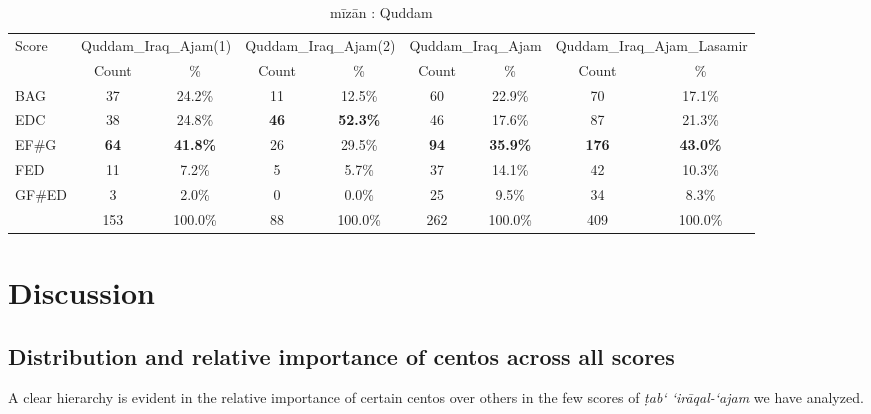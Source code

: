 \documentclass{article}
\begin{document}
\begin{table}[htbp]
    \caption{mīzān : Quddam}
    \begin{adjustbox}{width=0.5\textwidth}
    \small %
    \begin{tabular}{@{}lcccccccc@{}} %
        \toprule
        \multirow{2}{*}{Score} & \multicolumn{2}{c}{Quddam\_Iraq\_Ajam(1)} & \multicolumn{2}{c}{Quddam\_Iraq\_Ajam(2)} & \multicolumn{2}{c}{Quddam\_Iraq\_Ajam} & \multicolumn{2}{c}{Quddam\_Iraq\_Ajam\_Lasamir} \\
        \cmidrule(lr){2-3} \cmidrule(lr){4-5} \cmidrule(lr){6-7} \cmidrule(lr){8-9} %
         & Count & \% & Count & \% & Count & \% & Count & \% \\
        \midrule
        BAG & 37 & 24.2\% & 11 & 12.5\% & 60 & 22.9\% & 70 & 17.1\% \\
        EDC & 38 & 24.8\% & \textbf{46} & \textbf{52.3\%} & 46 & 17.6\% & 87 & 21.3\% \\
        EF\#G & \textbf{64} & \textbf{41.8\%} & 26 & 29.5\% & \textbf{94} & \textbf{35.9\%} & \textbf{176} & \textbf{43.0\%} \\
        FED & 11 & 7.2\% & 5 & 5.7\% & 37 & 14.1\% & 42 & 10.3\% \\
        GF\#ED & 3 & 2.0\% & 0 & 0.0\% & 25 & 9.5\% & 34 & 8.3\% \\
        \midrule
        & 153 & 100.0\% & 88 & 100.0\% & 262 & 100.0\% & 409 & 100.0\% \\
        \bottomrule
    \end{tabular}
    \end{adjustbox}
    \label{table:2}
\end{table}

\section{Discussion}\label{sec:Discussion}
\subsection{Distribution and relative importance of centos across all scores}


A clear hierarchy is evident in the relative importance of certain centos over others in the few scores of  \textit{ṭab‘ ‘irāqal-‘ajam} we have analyzed.
\end{document}
